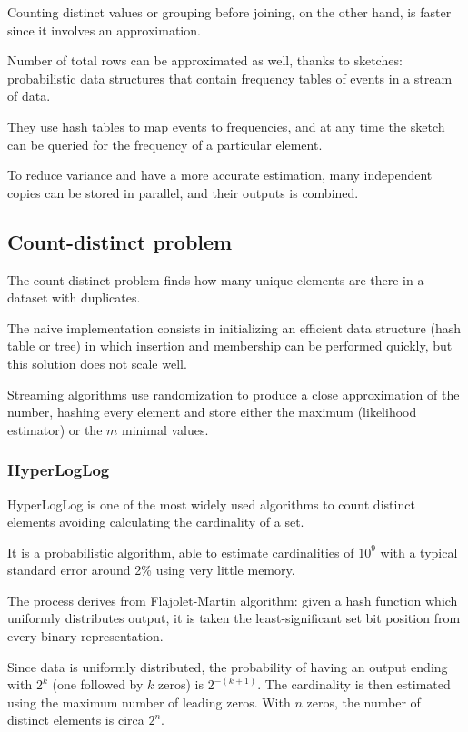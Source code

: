 Counting distinct values or grouping before joining, on the other hand, is faster since it involves an approximation.

Number of total rows can be approximated as well, thanks to sketches: probabilistic data structures that contain frequency tables of events in a stream of data.

They use hash tables to map events to frequencies, and at any time the sketch can be queried for the frequency of a particular element. 

To reduce variance and have a more accurate estimation, many independent copies can be stored in parallel, and their outputs is combined.

\subsection{Count-distinct problem}
The count-distinct problem finds how many unique elements are there in a dataset with duplicates. 

The naive implementation consists in initializing an efficient data structure (hash table or tree) in which insertion and membership can be performed quickly, but this solution does not scale well.

Streaming algorithms use randomization to produce a close approximation of the number, hashing every element and store either the maximum (likelihood estimator) or the $m$ minimal values.

\subsubsection{HyperLogLog}
HyperLogLog is one of the most widely used algorithms to count distinct elements avoiding calculating the cardinality of a set.

It is a probabilistic algorithm, able to estimate cardinalities of $10^{9}$ with a typical standard error around 2\% using very little memory. 

The process derives from Flajolet-Martin algorithm: given a hash function which uniformly distributes output, it is taken the least-significant set bit position from every binary representation. 

Since data is uniformly distributed, the probability of having an output ending with $2^k$ (one followed by $k$ zeros) is $2^{-(k+1)}$. The cardinality is then estimated using the maximum number of leading zeros. With $n$ zeros, the number of distinct elements is circa $2^n$.

